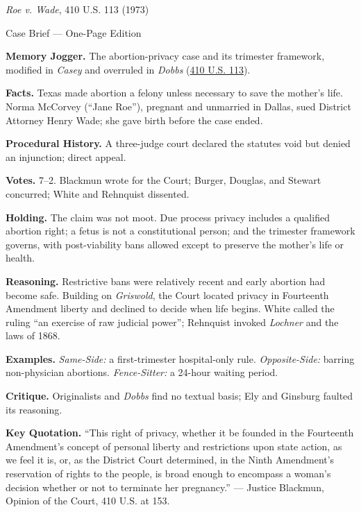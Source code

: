 \documentclass[12pt]{article}
\begin{document}
\begin{center}
{\Large \textit{Roe v. Wade}, 410 U.S. 113 (1973)\par}
\vspace{0.3em}
{\normalsize Case Brief --- One-Page Edition\par}
\end{center}

\textbf{Memory Jogger.} The abortion-privacy case and its trimester framework, modified in \textit{Casey} and overruled in \textit{Dobbs} (\href{https://supreme.justia.com/cases/federal/us/410/113/}{410 U.S. 113}).

\textbf{Facts.} Texas made abortion a felony unless necessary to save the mother's life. Norma McCorvey (``Jane Roe''), pregnant and unmarried in Dallas, sued District Attorney Henry Wade; she gave birth before the case ended.

\textbf{Procedural History.} A three-judge court declared the statutes void but denied an injunction; direct appeal.

\textbf{Votes.} 7--2. Blackmun wrote for the Court; Burger, Douglas, and Stewart concurred; White and Rehnquist dissented.

\textbf{Holding.} The claim was not moot. Due process privacy includes a qualified abortion right; a fetus is not a constitutional person; and the trimester framework governs, with post-viability bans allowed except to preserve the mother's life or health.

\textbf{Reasoning.} Restrictive bans were relatively recent and early abortion had become safe. Building on \textit{Griswold}, the Court located privacy in Fourteenth Amendment liberty and declined to decide when life begins. White called the ruling ``an exercise of raw judicial power''; Rehnquist invoked \textit{Lochner} and the laws of 1868.

\textbf{Examples.} \emph{Same-Side:} a first-trimester hospital-only rule. \emph{Opposite-Side:} barring non-physician abortions. \emph{Fence-Sitter:} a 24-hour waiting period.

\textbf{Critique.} Originalists and \textit{Dobbs} find no textual basis; Ely and Ginsburg faulted its reasoning.

\textbf{Key Quotation.} ``This right of privacy, whether it be founded in the Fourteenth Amendment's concept of personal liberty and restrictions upon state action, as we feel it is, or, as the District Court determined, in the Ninth Amendment's reservation of rights to the people, is broad enough to encompass a woman's decision whether or not to terminate her pregnancy.'' --- Justice Blackmun, Opinion of the Court, 410 U.S. at 153.
\end{document}
